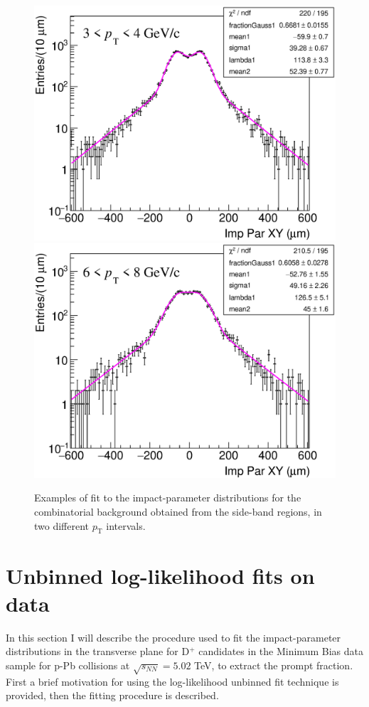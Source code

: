 \documentclass[b5paper,10pt,twoside,oldstyle,classica]{toptesi}
\newcommand{\pt}{p_\text{T}}
\begin{document}
\begin{figure}[tb]
\begin{center}
{\includegraphics[scale = 0.31]{ImpParBkg_3-4.eps}}
\hspace{-0.2cm}
{\includegraphics[scale = 0.31]{ImpParBkg_6-8.eps}}
\caption{Examples of fit to the impact-parameter distributions for the combinatorial background obtained from the side-band regions, in two different $\pt$ intervals.}
\label{SB_prefit}
\end{center}
\end{figure}
\section{Unbinned log-likelihood fits on data}
\label{IP_fits}
In this section I will describe the procedure used to fit the impact-parameter distributions in the transverse plane for D$^+$ candidates in the Minimum Bias data sample for p-Pb collisions at $\sqrt{s_{NN}}=5.02$ TeV, to extract the prompt fraction. First a brief motivation for using the log-likelihood unbinned fit technique is provided, then the fitting procedure is described.
\end{document}
